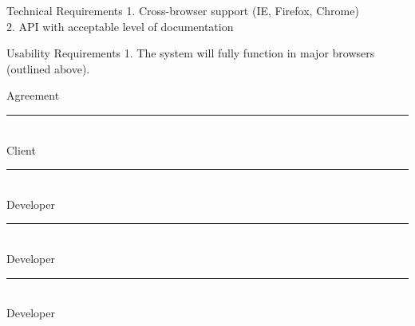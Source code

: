 \documentclass[letterpaper, 10pt,titlepage]{article}
\begin{document}
\begin{section}{Technical Requirements}
1.       Cross-browser support (IE, Firefox, Chrome) \\
2.       API with acceptable level of documentation \\


\end{section}

\begin{section}{Usability Requirements}
1.       The system will fully function in major browsers (outlined above). \\


\end{section}





\newpage
\begin{section}{Agreement}
\textbf{ }
\vspace{5.0cm}

\noindent\rule{13cm}{0.4pt}\\
Client
\vspace{3.0cm}

\noindent\rule{13cm}{0.4pt}\\
Developer
\vspace{3.0cm}


\noindent\rule{13cm}{0.4pt}\\
Developer
\vspace{3.0cm}


\noindent\rule{13cm}{0.4pt}\\
Developer
\vspace{3.0cm}

\end{section}
\end{document}
